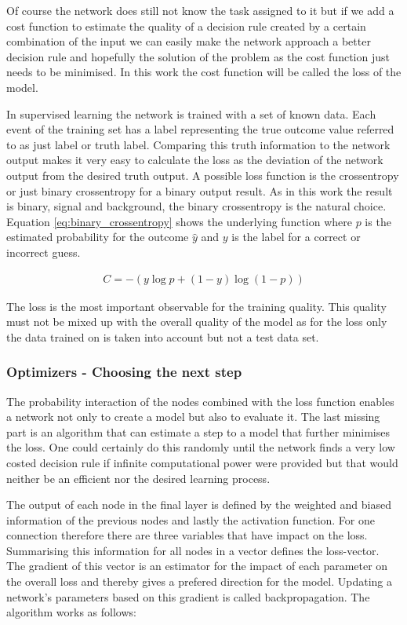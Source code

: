 Of course the network does still not know the task assigned to it but if we add a cost function to estimate the quality of a decision rule created by a certain combination of the input we can easily make the network approach a better decision rule and hopefully the solution of the problem as the cost function just needs to be minimised. In this work the cost function will be called the loss of the model.

In supervised learning the network is trained with a set of known data. Each event of the training set has a label representing the true outcome value referred to as just label or truth label. Comparing this truth information to the network output makes it very easy to calculate the loss as the deviation of the network output from the desired truth output. A possible loss function is the crossentropy or just binary crossentropy for a binary output result. As in this work the result is binary, signal and background, the binary crossentropy is the natural choice. Equation \eqref{eq:binary_crossentropy} shows the underlying function where $p$ is the estimated probability for the outcome $\hat{y}$ and $y$ is the label for a  correct or incorrect guess.

\begin{align}
    C = -(y \log p + (1 - y) \log (1 - p) )
    \label{eq:binary_crossentropy}
\end{align}

The loss is the most important observable for the training quality. This quality must not be mixed up with the overall quality of the model as for the loss only the data trained on is taken into account but not a test data set.

\subsubsection{Optimizers - Choosing the next step}

The probability interaction of the nodes combined with the loss function enables a network not only to create a model but also to evaluate it. The last missing part is an algorithm that can estimate a step to a model that further minimises the loss. One could certainly do this randomly until the network finds a very low costed decision rule if infinite computational power were provided but that would neither be an efficient nor the desired learning process.

The output of each node in the final layer is defined by the weighted and biased information of the previous nodes and lastly the activation function. For one connection therefore there are three variables that have impact on the loss. Summarising this information for all nodes in a vector defines the loss-vector. The gradient of this vector is an estimator for the impact of each parameter on the overall loss and thereby gives a prefered direction for the model. Updating a network's parameters based on this gradient is called backpropagation. The algorithm works as follows:

